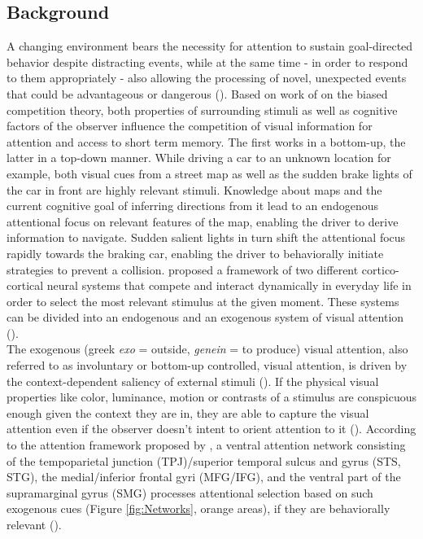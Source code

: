 \documentclass[a4paper, 12pt]{scrreprt}
\begin{document}
\subsection{Background}\label{section:visualattention}
A changing environment bears the necessity for attention to sustain goal-directed behavior despite distracting events, while at the same time - in order to respond to them appropriately - also allowing the processing of novel, unexpected events that could be advantageous or dangerous (\cite{chica2013two}). Based on work of \textcite{desimone1995neural} on the biased competition theory, both properties of surrounding stimuli as well as cognitive factors of the observer influence the competition of visual information for attention and access to short term memory. The first works in a bottom-up, the latter in a top-down manner. While driving a car to an unknown location for example, both visual cues from a street map as well as the sudden brake lights of the car in front are highly relevant stimuli. Knowledge about maps and the current cognitive goal of inferring directions from it lead to an endogenous attentional focus on relevant features of the map, enabling the driver to derive information to navigate. Sudden salient lights in turn shift the attentional focus rapidly towards the braking car, enabling the driver to behaviorally initiate strategies to prevent a collision. \textcite{corbetta2002control} proposed a framework of two different cortico-cortical neural systems that compete and interact dynamically in everyday life in order to select the most relevant stimulus at the given moment. These systems can be divided into an endogenous and an exogenous system of visual attention (\cite{corbetta2002control}).
\\
The exogenous (greek \textit{exo} = outside, \textit{genein} = to produce) visual attention, also referred to as involuntary or bottom-up controlled, visual attention, is driven by the context-dependent saliency of external stimuli (\cite{itti2001computational}). If the physical visual properties like color, luminance, motion or contrasts of a stimulus are conspicuous enough given the context they are in, they are able to capture the visual attention even if the observer doesn’t intent to orient attention to it (\cite{chica2013two}). According to the attention framework proposed by \textcite{corbetta2002control}, a ventral attention network consisting of the tempoparietal junction (TPJ)/superior temporal sulcus and gyrus (STS, STG), the medial/inferior frontal gyri (MFG/IFG), and the ventral part of the supramarginal gyrus (SMG) processes attentional selection based on such exogenous cues (Figure \ref{fig:Networks}, orange areas), if they are behaviorally relevant (\cite{downar2000multimodal}). \\
\end{document}
